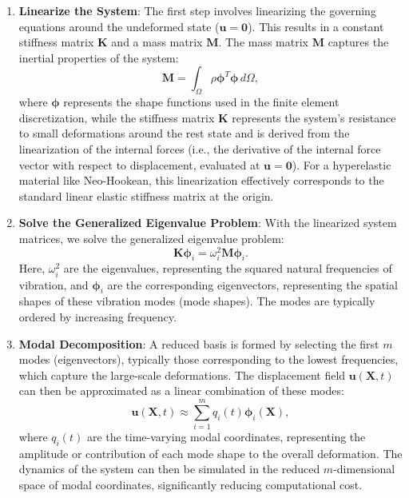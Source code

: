 \begin{enumerate}
    \item \textbf{Linearize the System}: The first step involves linearizing the governing equations around the undeformed state ($\bm{u}=\bm{0}$). This results in a constant stiffness matrix $\bm{K}$ and a mass matrix $\bm{M}$. The mass matrix $\bm{M}$ captures the inertial properties of the system:
        \begin{equation}
            \bm{M} = \int_{\Omega} \rho \bm{\phi}^T \bm{\phi} \, d\Omega, 
            \label{eq:mass_matrix}
        \end{equation}
        where $\bm{\phi}$ represents the shape functions used in the finite element discretization, while the stiffness matrix $\bm{K}$ represents the system's resistance to small deformations around the rest state and is derived from the linearization of the internal forces (i.e., the derivative of the internal force vector with respect to displacement, evaluated at $\bm{u}=\bm{0}$). For a hyperelastic material like Neo-Hookean, this linearization effectively corresponds to the standard linear elastic stiffness matrix at the origin.

    \item \textbf{Solve the Generalized Eigenvalue Problem}: With the linearized system matrices, we solve the generalized eigenvalue problem:
        \begin{equation}
            \bm{K} \bm{\phi}_i = \omega_i^2 \bm{M} \bm{\phi}_i.
            \label{eq:eigenvalue_problem}
        \end{equation}
        Here, $\omega_i^2$ are the eigenvalues, representing the squared natural frequencies of vibration, and $\bm{\phi}_i$ are the corresponding eigenvectors, representing the spatial shapes of these vibration modes (mode shapes). The modes are typically ordered by increasing frequency.

    \item \textbf{Modal Decomposition}: A reduced basis is formed by selecting the first $m$ modes (eigenvectors), typically those corresponding to the lowest frequencies, which capture the large-scale deformations. The displacement field $\bm{u}(\bm{X},t)$ can then be approximated as a linear combination of these modes:
        \begin{equation}
            \bm{u}(\bm{X},t) \approx \sum_{i=1}^{m} q_i(t) \bm{\phi}_i(\bm{X}),
            \label{eq:modal_decomposition}
        \end{equation}
        where $q_i(t)$ are the time-varying modal coordinates, representing the amplitude or contribution of each mode shape to the overall deformation. The dynamics of the system can then be simulated in the reduced $m$-dimensional space of modal coordinates, significantly reducing computational cost.
\end{enumerate}


